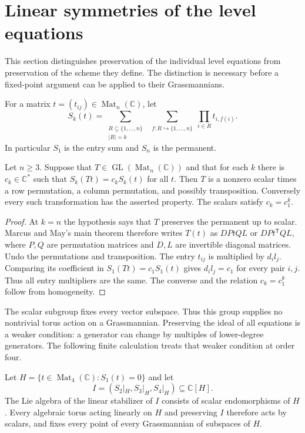 \section{Linear symmetries of the level equations}

This section distinguishes preservation of the individual level equations from
preservation of the scheme they define.  The distinction is necessary before a
fixed-point argument can be applied to their Grassmannians.

For a matrix $t=(t_{ij})\in\operatorname{Mat}_n(\mathbb C)$, let
\[
 S_k(t)=\sum_{\substack{R\subseteq\{1,\ldots,n\}\\|R|=k}}
        \ \sum_{\substack{f:R\hookrightarrow\{1,\ldots,n\}}}
             \prod_{i\in R}t_{i,f(i)}.
\]
In particular $S_1$ is the entry sum and $S_n$ is the permanent.

\begin{proposition}\label{prop:conformal-layers}
Let $n\geq3$.  Suppose that $T\in\operatorname{GL}(\operatorname{Mat}_n(\mathbb C))$
and that for each $k$ there is $c_k\in\mathbb C^*$ such that
$S_k(Tt)=c_kS_k(t)$ for all $t$.  Then $T$ is a nonzero scalar times a row
permutation, a column permutation, and possibly transposition.  Conversely every
such transformation has the asserted property.  The scalars satisfy $c_k=c_1^k$.
\end{proposition}

\begin{proof}
At $k=n$ the hypothesis says that $T$ preserves the permanent up to scalar.
Marcus and May's main theorem \cite[Section~2, Theorem, p.~179,
(2.2)--(2.4)]{MarcusMay1962} therefore writes $T(t)$ as $DPtQL$ or $DPt^{\mathsf T}QL$,
where $P,Q$ are permutation matrices and $D,L$ are invertible diagonal matrices.
Undo the permutations and transposition.  The entry $t_{ij}$ is multiplied by
$d_i l_j$.  Comparing its coefficient in $S_1(Tt)=c_1S_1(t)$ gives
$d_i l_j=c_1$ for every pair $i,j$.  Thus all entry multipliers are the same.
The converse and the relation $c_k=c_1^k$ follow from homogeneity.
\end{proof}

The scalar subgroup fixes every vector subspace.  Thus this group supplies no
nontrivial torus action on a Grassmannian.  Preserving the ideal of all equations
is a weaker condition: a generator can change by multiples of lower-degree
generators.  The following finite calculation treats that weaker condition at
order four.

\begin{theorem}\label{thm:scheme-torus-four}
Let $H=\{t\in\operatorname{Mat}_4(\mathbb C):S_1(t)=0\}$ and let
\[
 I=(S_2|_H,S_3|_H,S_4|_H)\subseteq\mathbb C[H].
\]
The Lie algebra of the linear stabilizer of $I$ consists of scalar endomorphisms
of $H$.  Every algebraic torus acting linearly on $H$ and preserving $I$ therefore
acts by scalars, and fixes every point of every Grassmannian of subspaces of $H$.
\end{theorem}

